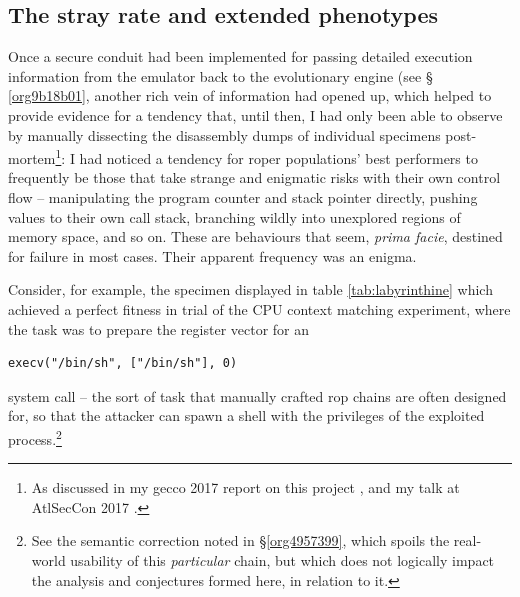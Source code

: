 \documentclass[12pt,glossary]{dalthesis}
\begin{document}
\subsection{The stray rate and extended phenotypes}
\label{sec:orgf3c0a22}
\label{orgcc1cb53}

Once a secure conduit had been implemented for passing detailed execution
information from the emulator back to the evolutionary engine (see \S
\ref{org9b18b01},
another rich vein of information had opened up, which helped to provide evidence for a
tendency that, until then, I had only been able to observe by manually
dissecting the disassembly dumps of individual specimens post-mortem\footnote{As discussed in my \gls{gecco} 2017 report on this project \cite{fraser17_gecco},
  and my talk at AtlSecCon 2017 \cite{fraser17_atlseccon}.}: I had noticed a tendency for \gls{roper} populations' best
performers to frequently be those that take strange and enigmatic risks with their own
control flow -- manipulating the program counter and stack pointer directly,
pushing values to their own call stack, branching wildly into unexplored regions
of memory space, and so on. These are behaviours that seem, \emph{prima facie}, destined
for failure in most cases. Their apparent frequency was an enigma. 

Consider, for example, the specimen displayed in 
table \ref{tab:labyrinthine} which
achieved a perfect fitness in trial of the CPU context matching experiment,
where the task was to prepare the register vector for an
\begin{verbatim}
execv("/bin/sh", ["/bin/sh"], 0)
\end{verbatim}
system call -- the sort of task that manually crafted \gls{rop} chains are often
designed for, so that the attacker can spawn a shell with the privileges of the
exploited process.\footnote{See the semantic correction noted in \S \ref{org4957399}, which 
  spoils the real-world usability of this \emph{particular} chain, but which
  does not logically impact the analysis and conjectures formed here,
  in relation to it.}
\end{document}
